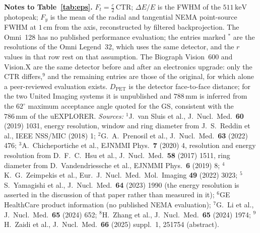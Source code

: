 \documentclass[11pt,a4paper]{article}
\newcommand{\Lsrc}{L_{\mathrm{s}}}
\newcommand{\Dpet}{D_{\mathrm{PET}}}
\newcommand{\Dcyl}{D_{\mathrm{cyl}}}
\newcommand{\Sid}{S_{\mathrm{ideal}}}
\newcommand{\Snema}{S_{\mathrm{NEMA}}}
\newcommand{\Ft}{F_{t}}
\newcommand{\Fy}{F_{y}}
\newcommand{\rT}{r_{\mathrm{TOF}}}
\newcommand{\rN}{r_{\mathrm{nonTOF}}}
\begin{document}
\begin{table}
\centering\footnotesize
\setlength{\tabcolsep}{3.5pt}

\caption{Detector-pair efficiencies of ten current PET configurations, ordered by vendor
and detector design. $\Sid$ follows from Eq.~\eqref{eq:summary} with
$\Lsrc=700\,\mathrm{mm}$ and $\epsilon$ from Eq.~\eqref{eq:eps}; $\Snema$ is the NEMA NU~2
sensitivity for the centred line source. All resolutions are full widths at half maximum,
ready to be used directly in Eq.~\eqref{eq:wFWHM}, and the last two columns give the
resolution factor $r$ for two SLoG sizes: $\rT$ of Eq.~\eqref{eq:Fres} for the
time-of-flight systems, $\rN$ of Eq.~\eqref{eq:FnoTOF} with $\Dcyl=300\,\mathrm{mm}$ for the
two BGO ones. Notes and sources below.}
\label{tab:eps}
\vspace{1.2ex}
\parbox{0.99\textheight}{\footnotesize \textbf{Notes to Table~\ref{tab:eps}.} $\Ft=\tfrac{c}{2}\,\mathrm{CTR}$; $\Delta E/E$ is the
FWHM of the $511\,\mathrm{keV}$ photopeak; $\Fy$ is the mean of the radial and tangential
NEMA point-source FWHM at $1\,\mathrm{cm}$ from the axis, reconstructed by filtered
backprojection. The Omni~128 has no published performance evaluation; the entries marked
$^{\ast}$ are the resolutions of the Omni Legend~32, which uses the same detector, and the
$r$ values in that row rest on that assumption. The Biograph Vision~600 and Vision.X are the
same detector before and after an electronics upgrade: only the CTR differs,$^{9}$ and the
remaining entries are those of the original, for which alone a peer-reviewed evaluation
exists. $\Dpet$ is the detector face-to-face distance; for the two United Imaging systems it
is unpublished and $788\,\mathrm{mm}$ is inferred from the $62^{\circ}$ maximum acceptance
angle quoted for the GS, consistent with the $786\,\mathrm{mm}$ of the uEXPLORER.
\emph{Sources:}
$^{1}$J.~van Sluis et al., J.\ Nucl.\ Med.\ \textbf{60} (2019) 1031, energy resolution,
window and ring diameter from J.~S.~Reddin et al., IEEE NSS/MIC (2018) 1;
$^{2}$G.~A.~Prenosil et al., J.\ Nucl.\ Med.\ \textbf{63} (2022) 476;
$^{3}$A.~Chicheportiche et al., EJNMMI Phys.\ \textbf{7} (2020) 4, resolution and energy
resolution from D.~F.~C.~Hsu et al., J.\ Nucl.\ Med.\ \textbf{58} (2017) 1511, ring
diameter from D.~Vandendriessche et al., EJNMMI Phys.\ \textbf{6} (2019) 8;
$^{4}$K.~G.~Zeimpekis et al., Eur.\ J.\ Nucl.\ Med.\ Mol.\ Imaging \textbf{49} (2022) 3023;
$^{5}$S.~Yamagishi et al., J.\ Nucl.\ Med.\ \textbf{64} (2023) 1990 (the energy resolution
is asserted in the discussion of that paper rather than measured in it);
$^{6}$GE HealthCare product information (no published NEMA evaluation);
$^{7}$G.~Li et al., J.\ Nucl.\ Med.\ \textbf{65} (2024) 652;
$^{8}$H.~Zhang et al., J.\ Nucl.\ Med.\ \textbf{65} (2024) 1974;
$^{9}$H.~Zaidi et al., J.\ Nucl.\ Med.\ \textbf{66} (2025) suppl.\ 1, 251754 (abstract).}
\end{table}
\end{document}
